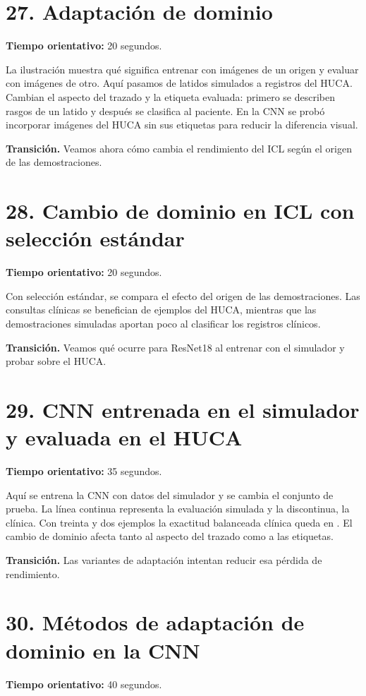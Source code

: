 \documentclass[11pt,a4paper]{article}
\begin{document}
\section*{27. Adaptación de dominio}
\textbf{Tiempo orientativo: }20 segundos.

La ilustración muestra qué significa entrenar con imágenes de un origen y evaluar con imágenes de otro. Aquí pasamos de latidos simulados a registros del HUCA. Cambian el aspecto del trazado y la etiqueta evaluada: primero se describen rasgos de un latido y después se clasifica al paciente. En la CNN se probó incorporar imágenes del HUCA sin sus etiquetas para reducir la diferencia visual.

\textbf{Transición.} Veamos ahora cómo cambia el rendimiento del ICL según el origen de las demostraciones.

\section*{28. Cambio de dominio en ICL con selección estándar}
\textbf{Tiempo orientativo: }20 segundos.

Con selección estándar, se compara el efecto del origen de las demostraciones. Las consultas clínicas se benefician de ejemplos del HUCA, mientras que las demostraciones simuladas aportan poco al clasificar los registros clínicos.

\textbf{Transición.} Veamos qué ocurre para ResNet18 al entrenar con el simulador y probar sobre el HUCA.

\section*{29. CNN entrenada en el simulador y evaluada en el HUCA}
\textbf{Tiempo orientativo: }35 segundos.

Aquí se entrena la CNN con datos del simulador y se cambia el conjunto de prueba. La línea continua representa la evaluación simulada y la discontinua, la clínica. Con treinta y dos ejemplos la exactitud balanceada clínica queda en \TransferCnnLastBA{}. El cambio de dominio afecta tanto al aspecto del trazado como a las etiquetas.

\textbf{Transición.} Las variantes de adaptación intentan reducir esa pérdida de rendimiento.

\section*{30. Métodos de adaptación de dominio en la CNN}
\textbf{Tiempo orientativo: }40 segundos.
\end{document}
